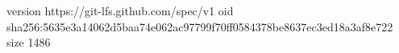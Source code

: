 version https://git-lfs.github.com/spec/v1
oid sha256:5635e3a14062d5baa74e062ac97799f70ff0584378be8637ec3ed18a3af8e722
size 1486
